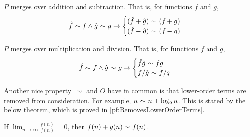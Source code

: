 \begin{theorem}
	$P$ merges over addition and subtraction. That is, for functions $f$ and $g$,
	\begin{align*}
	\hat{f} \ \mathtt{\sim}\  f \land \hat{g} \ \mathtt{\sim}\  g \rightarrow \begin{cases}
		(\hat{f} + \hat{g}) \ \mathtt{\sim}\  (f + g)\\
		(\hat{f} - \hat{g}) \ \mathtt{\sim}\  (f - g)
	\end{cases}
	\end{align*}
\end{theorem}

\begin{theorem}
	$P$ merges over multiplication and division. That is, for functions $f$ and $g$,
	\begin{align*}
	\hat{f} \ \mathtt{\sim}\  f \land \hat{g} \ \mathtt{\sim}\  g \rightarrow \begin{cases}
	\hat{f}\hat{g} \ \mathtt{\sim}\  fg\\
	\hat{f} / \hat{g} \ \mathtt{\sim}\  f / g
	\end{cases}
	\end{align*}
\end{theorem}

Another nice property $\ \mathtt{\sim}\ $ and $O$ have in common is that lower-order terms are removed from consideration. For example, $n \ \mathtt{\sim}\  n + \log_2 n$. This is stated by the below theorem, which is proved in \ref{pf:RemovesLowerOrderTerms}.

\begin{theorem}
	If $\lim_{n \to \infty} \frac{g(n)}{f(n)} = 0$, then $f(n) + g(n) \ \mathtt{\sim}\  f(n)$.
\end{theorem}
